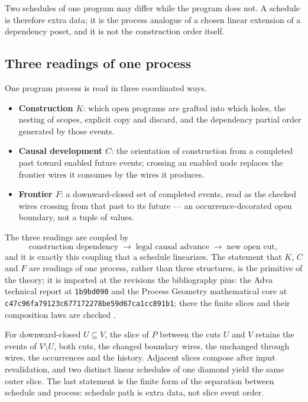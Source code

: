 Two schedules of one program may differ while the program does not.  A schedule is
therefore extra data; it is the process analogue of a chosen linear extension of a
dependency poset, and it is not the construction order itself.

\subsection{Three readings of one process}

One program process is read in three coordinated ways.

\begin{itemize}
\item \textbf{Construction $K$}: which open programs are grafted into which holes,
  the nesting of scopes, explicit copy and discard, and the dependency partial
  order generated by those events.
\item \textbf{Causal development $C$}: the orientation of construction from a
  completed past toward enabled future events; crossing an enabled node replaces
  the frontier wires it consumes by the wires it produces.
\item \textbf{Frontier $F$}: a downward-closed set of completed events, read as the
  checked wires crossing from that past to its future --- an occurrence-decorated
  open boundary, not a tuple of values.
\end{itemize}

The three readings are coupled by
\[
\text{construction dependency}\;\longrightarrow\;\text{legal causal advance}
\;\longrightarrow\;\text{new open cut},
\]
and it is exactly this coupling that a schedule linearizes.  The statement that $K$,
$C$ and $F$ are readings of one process, rather than three structures, is the
primitive of the theory; it is imported at the revisions the bibliography pins: the Adva technical report at
\texttt{1b9bd090} and the Process Geometry mathematical core at
\texttt{c47c96fa79123c677172278be59d67ca1cc891b1}; there the finite slices and their
composition laws are checked \cite{AdvaProcessCore2026,ProcessGeometryCore2026}.

\begin{remark}[Slices]\label{rem:slices}
For downward-closed $U\subseteq V$, the slice of $P$ between the cuts $U$ and $V$
retains the events of $V\setminus U$, both cuts, the changed boundary wires, the
unchanged through wires, the occurrences and the history.  Adjacent slices compose
after input revalidation, and two distinct linear schedules of one diamond yield the
same outer slice.  The last statement is the finite form of the separation between
schedule and process: schedule path is extra data, not slice event order.
\end{remark}

